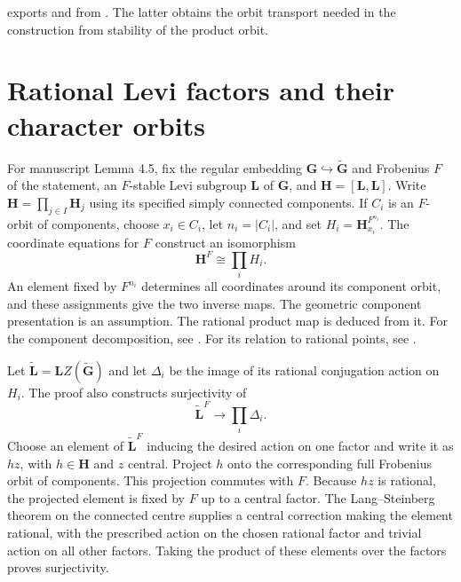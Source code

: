 \begin{implementation}
 exports
 and
 from
. The latter obtains the orbit
transport needed in the construction from stability of the product orbit.
\end{implementation}

\section{Rational Levi factors and their character orbits}

For manuscript Lemma 4.5, fix the regular embedding
$\mathbf G\hookrightarrow\widetilde{\mathbf G}$ and Frobenius $F$ of the
statement, an $F$-stable Levi subgroup $\mathbf L$ of $\mathbf G$, and
$\mathbf H=[\mathbf L,\mathbf L]$. Write
$\mathbf H=\prod_{j\in I}\mathbf H_j$ using its specified simply
connected components. If $C_i$ is an $F$-orbit of components, choose
$x_i\in C_i$, let $n_i=|C_i|$, and set
$H_i=\mathbf H_{x_i}^{F^{n_i}}$. The coordinate equations for $F$
construct an isomorphism
\[
 \mathbf H^F\cong\prod_i H_i.
\]
An element fixed by $F^{n_i}$ determines all coordinates around
its component orbit, and these assignments give the two inverse maps.
The geometric component presentation is an assumption. The rational product
map is deduced from it. For the component decomposition, see
\cite[Proposition~12.14]{MalleTesterman2011}. For its relation to rational
points, see \cite[Lemma~1.5.15 and Corollary~1.5.16]{GeckMalle2020}.

Let $\widetilde{\mathbf L}=\mathbf LZ(\widetilde{\mathbf G})$ and
let $\Delta_i$ be the image of its rational conjugation action on
$H_i$. The proof also constructs surjectivity of
\[
 \widetilde{\mathbf L}^{F}\longrightarrow\prod_i\Delta_i.
\]
Choose an element of $\widetilde{\mathbf L}^{F}$ inducing the desired action on one
factor and write it as $hz$, with $h\in\mathbf H$ and $z$ central.
Project $h$ onto the corresponding full Frobenius orbit of components.
This projection commutes with $F$. Because $hz$ is rational, the projected
element is fixed by $F$ up to a central factor. The Lang--Steinberg theorem on the
connected centre supplies a central correction making the element rational,
with the prescribed action on the chosen rational factor and trivial action
on all other factors. Taking the product of these elements over the factors
proves surjectivity.

